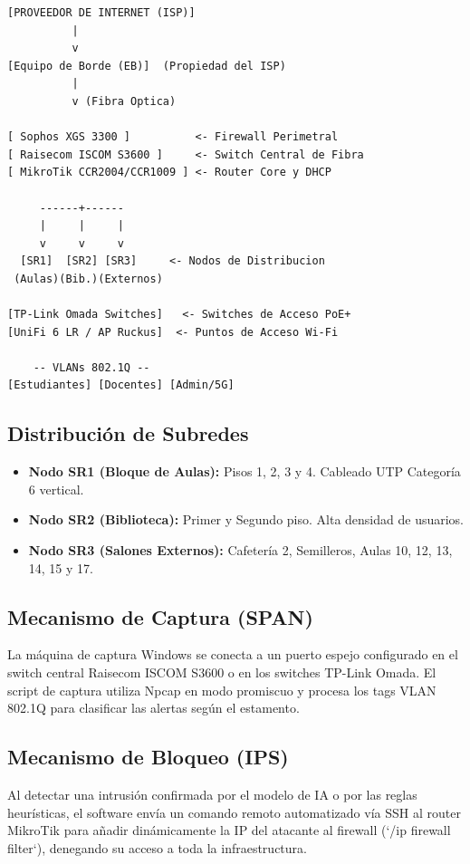 \documentclass[12pt,letterpaper]{report}
\begin{document}
\begin{verbatim}
[PROVEEDOR DE INTERNET (ISP)]
          |
          v
[Equipo de Borde (EB)]  (Propiedad del ISP)
          |
          v (Fibra Optica)

[ Sophos XGS 3300 ]          <- Firewall Perimetral
[ Raisecom ISCOM S3600 ]     <- Switch Central de Fibra
[ MikroTik CCR2004/CCR1009 ] <- Router Core y DHCP

     ------+------
     |     |     |
     v     v     v
  [SR1]  [SR2] [SR3]     <- Nodos de Distribucion
 (Aulas)(Bib.)(Externos)

[TP-Link Omada Switches]   <- Switches de Acceso PoE+
[UniFi 6 LR / AP Ruckus]  <- Puntos de Acceso Wi-Fi

    -- VLANs 802.1Q --
[Estudiantes] [Docentes] [Admin/5G]
\end{verbatim}

\subsection{Distribución de Subredes}

\begin{itemize}
  \item \textbf{Nodo SR1 (Bloque de Aulas):} Pisos 1, 2, 3 y 4. Cableado UTP Categoría 6 vertical.
  \item \textbf{Nodo SR2 (Biblioteca):} Primer y Segundo piso. Alta densidad de usuarios.
  \item \textbf{Nodo SR3 (Salones Externos):} Cafetería 2, Semilleros, Aulas 10, 12, 13, 14, 15 y 17.
\end{itemize}

\subsection{Mecanismo de Captura (SPAN)}

La máquina de captura Windows se conecta a un puerto espejo configurado en el switch central Raisecom ISCOM S3600 o en los switches TP-Link Omada. El script de captura utiliza Npcap en modo promiscuo y procesa los tags VLAN 802.1Q para clasificar las alertas según el estamento.

\subsection{Mecanismo de Bloqueo (IPS)}

Al detectar una intrusión confirmada por el modelo de IA o por las reglas heurísticas, el software envía un comando remoto automatizado vía SSH al router MikroTik para añadir dinámicamente la IP del atacante al firewall (`/ip firewall filter`), denegando su acceso a toda la infraestructura.
\end{document}

